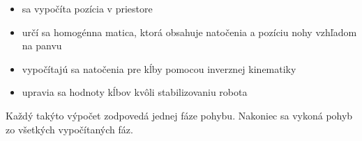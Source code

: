 \begin{itemize}
 \item sa vypočíta pozícia v priestore
 \item určí sa homogénna matica, ktorá obsahuje natočenia a pozíciu nohy vzhľadom na panvu
 \item vypočítajú sa natočenia pre kĺby pomocou inverznej kinematiky
 \item upravia sa hodnoty kĺbov kvôli stabilizovaniu robota
\end{itemize}
Každý takýto výpočet zodpovedá jednej fáze pohybu. Nakoniec sa vykoná pohyb zo všetkých vypočítaných fáz.